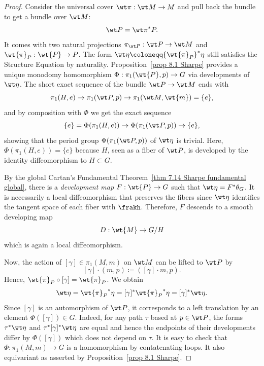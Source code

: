 \begin{proof}
    Consider the universal cover $\wt\pi:\wt M\to M$ and pull back the bundle to get a bundle over $\wt M$:
    \[\wt P={\wt\pi}^\ast P.\]
    It comes with two natural projections $\pi_{\wt P}:\wt P\to \wt M$ and $\wt{\pi}_P:\wt{P}\to P$. The form $\wt\eta\coloneqq {\wt{\pi}_P}^\ast\eta$ still satisfies the Structure Equation by naturality. Proposition~\ref{prop 8.1 Sharpe} provides a unique monodomy homomorphism $\Phi:\pi_1(\wt{P},p)\to G$ via developments of $\wt\eta$. The short exact sequence of the bundle $\wt P\to \wt M$ ends with
    \[\pi_1(H,e)\to \pi_1(\wt P,p)\to \pi_1(\wt M,\wt{m})=\{e\},\]
    and by composition with $\Phi$ we get the exact sequence 
    \[\{e\}=\Phi(\pi_1(H,e))\to \Phi(\pi_1(\wt P,p))\to \{e\},\]
    showing that the period group $\Phi(\pi_1(\wt P,p))$ of $\wt\eta$ is trivial. Here, $\Phi(\pi_1(H,e))=\{e\}$ because $H$, seen as a fiber of $\wt P$, is developed by the identity diffeomorphism to $H\subset G$.

    By the global Cartan's Fundamental Theorem~\ref{thm 7.14 Sharpe fundamental global}, there is a \emph{development map} $F:\wt{P}\to G$ such that $\wt\eta=F^\ast\theta_G$. It is necessarily a local diffeomorphism that preserves the fibers since $\wt\eta$ identifies the tangent space of each fiber with $\frakh$. Therefore, $F$ descends to a smooth developing map 
    \[D:\wt{M}\to G\slash H\]
    which is again a local diffeomorphism. 

    Now, the action of $[\gamma]\in \pi_1(M,m)$ on $\wt M$ can be lifted to $\wt P$ by
    \[[\gamma]\cdot (m,p)\coloneqq ([\gamma]\cdot m,p).\]
    Hence, $\wt{\pi}_P\circ [\gamma]=\wt{\pi}_P$. We obtain
    \[\wt\eta={\wt{\pi}_P}^\ast \eta=[\gamma]^\ast {\wt{\pi}_P}^\ast \eta=[\gamma]^\ast\wt\eta.\]
    Since $[\gamma]$ is an automorphism of $\wt P$, it corresponds to a left translation by an element $\Phi([\gamma])\in G$. Indeed, for any path $\tau$ based at $p\in\wt P$, the forms $\tau^\ast\wt\eta$ and $\tau^\ast[\gamma]^\ast\wt\eta$ are equal and hence the endpoints of their developments differ by $\Phi([\gamma])$ which does not depend on $\tau$. It is easy to check that $\Phi:\pi_1(M,m)\to G$ is a homomorphism by contatenating loops. It also equivariant as asserted by Proposition~\ref{prop 8.1 Sharpe}.


\end{proof}
